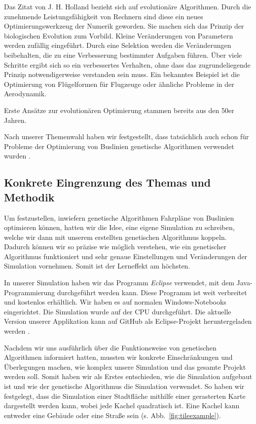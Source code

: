 \documentclass[a4paper, 11pt]{scrartcl}
\begin{document}
Das Zitat von J. H. Holland \cite{holland1992} bezieht sich auf evolutionäre Algorithmen. Durch die zunehmende Leistungsfähigkeit von Rechnern sind diese ein neues Optimierungswerkzeug der Numerik geworden. Sie machen sich das Prinzip der biologischen Evolution zum Vorbild. Kleine Veränderungen von Parametern werden zufällig eingeführt. Durch eine Selektion werden die Veränderungen beibehalten, die zu eine Verbesserung bestimmter Aufgaben führen. Über viele Schritte ergibt sich so ein verbessertes Verhalten, ohne dass das zugrundeliegende Prinzip notwendigerweise verstanden sein muss. Ein bekanntes Beispiel \cite{gerdes2004} ist die Optimierung von Flügelformen für Flugzeuge oder ähnliche Probleme in der Aerodynamik.

Erste Ansätze zur evolutionären Optimierung stammen bereits aus den 50er Jahren. \cite{gerdes2004}

Nach unserer Themenwahl haben wir festgestellt, dass tatsächlich auch schon für Probleme der Optimierung von Buslinien genetische Algorithmen verwendet wurden \cite{yu2011}.



\subsection{Konkrete Eingrenzung des Themas und Methodik}
\label{sec:Einschraenkungen_unseres_Themas}
Um festzustellen, inwiefern genetische Algorithmen Fahrpläne von Buslinien optimieren können, hatten wir die Idee, eine eigene Simulation zu schreiben, welche wir dann mit unserem erstellten genetischen Algorithmus koppeln. Dadurch können wir so präzise wie möglich verstehen, wie ein genetischer Algorithmus funktioniert und sehr genaue Einstellungen und Veränderungen der Simulation vornehmen. Somit ist der Lerneffekt am höchsten. 

In unserer Simulation haben wir das Programm \textit{Eclipse} verwendet, mit dem Java-Programmierung durchgeführt werden kann. Diese Programm ist weit verbreitet und kostenlos erhältlich. Wir haben es auf normalen Windows-Notebooks eingerichtet. Die Simulation wurde auf der CPU durchgeführt.
Die aktuelle Version unserer Applikation kann auf GitHub als Eclipse-Projekt heruntergeladen werden \cite{trafficsimGitHub}.

Nachdem wir uns ausführlich über die Funktionsweise von genetischen Algorithmen informiert hatten, mussten wir konkrete Einschränkungen und Überlegungen machen, wie komplex unsere Simulation und das gesamte Projekt werden soll. Somit haben wir als Erstes entschieden, wie die Simulation aufgebaut ist und wie der genetische Algorithmus die Simulation verwendet. So haben wir festgelegt, dass die Simulation einer Stadtfläche mithilfe einer gerasterten Karte dargestellt werden kann, wobei jede Kachel quadratisch ist. Eine Kachel kann entweder eine Gebäude oder eine Straße sein (s. Abb.~\ref{fig:tileexample}).
\end{document}
